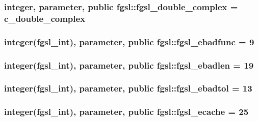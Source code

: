 \subsubsection[{fgsl\+\_\+double\+\_\+complex}]{\setlength{\rightskip}{0pt plus 5cm}integer, parameter, public fgsl\+::fgsl\+\_\+double\+\_\+complex = c\+\_\+double\+\_\+complex}\label{namespacefgsl_a66d0fde3788cc0c300046f8fcd07d702}
\hypertarget{namespacefgsl_aee7266f310ad4022066e6fe82eecc0f9}{}
\subsubsection[{fgsl\+\_\+ebadfunc}]{\setlength{\rightskip}{0pt plus 5cm}integer({\bf fgsl\+\_\+int}), parameter, public fgsl\+::fgsl\+\_\+ebadfunc = 9}\label{namespacefgsl_aee7266f310ad4022066e6fe82eecc0f9}
\hypertarget{namespacefgsl_ac1f16c63f7a3d224fceb2113566856f5}{}
\subsubsection[{fgsl\+\_\+ebadlen}]{\setlength{\rightskip}{0pt plus 5cm}integer({\bf fgsl\+\_\+int}), parameter, public fgsl\+::fgsl\+\_\+ebadlen = 19}\label{namespacefgsl_ac1f16c63f7a3d224fceb2113566856f5}
\hypertarget{namespacefgsl_a3df3fe39582721655da00574f4b021d1}{}
\subsubsection[{fgsl\+\_\+ebadtol}]{\setlength{\rightskip}{0pt plus 5cm}integer({\bf fgsl\+\_\+int}), parameter, public fgsl\+::fgsl\+\_\+ebadtol = 13}\label{namespacefgsl_a3df3fe39582721655da00574f4b021d1}
\hypertarget{namespacefgsl_aa9ace1ec026e9acd65806d63c8b6e649}{}
\subsubsection[{fgsl\+\_\+ecache}]{\setlength{\rightskip}{0pt plus 5cm}integer({\bf fgsl\+\_\+int}), parameter, public fgsl\+::fgsl\+\_\+ecache = 25}\label{namespacefgsl_aa9ace1ec026e9acd65806d63c8b6e649}
\hypertarget{namespacefgsl_a955eb5c7585781ffb9e336843a471566}{}

